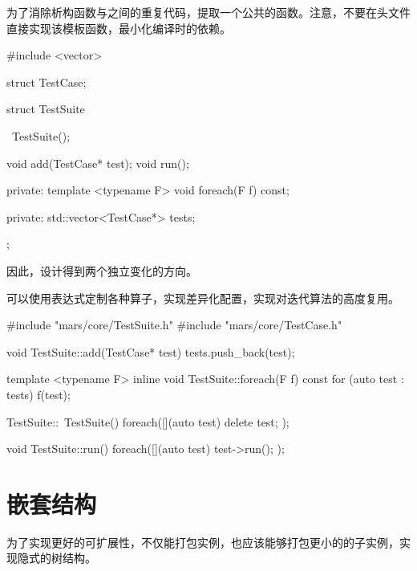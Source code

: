 \begin{content}
为了消除析构函数与之间的重复代码，提取一个公共的函数。注意，不要在头文件直接实现该模板函数，最小化编译时的依赖。

\begin{leftbar}
 \begin{c++}[caption={\ttfamily{include/mars/core/TestSuite.h}}]
#include <vector>

struct TestCase;

struct TestSuite {
  ~TestSuite();

  void add(TestCase* test);
  void run();

private:
  template <typename F>
  void foreach(F f) const;

private:
  std::vector<TestCase*> tests;
};
 \end{c++}
\end{leftbar}

因此，设计得到两个独立变化的方向。

\begin{enum}
\end{enum}

可以使用表达式定制各种算子，实现差异化配置，实现对迭代算法的高度复用。

\begin{leftbar}
 \begin{c++}[caption={\ttfamily{src/mars/core/TestSuite.cc}}]
#include "mars/core/TestSuite.h"
#include "mars/core/TestCase.h"

void TestSuite::add(TestCase* test) {
  tests.push_back(test);
}

template <typename F>
inline void TestSuite::foreach(F f) const {
  for (auto test : tests) {
    f(test);
  }
}

TestSuite::~TestSuite() {
  foreach([](auto test) {
    delete test;
  });
}

void TestSuite::run() {
  foreach([](auto test) {
    test->run();
  });
}
 \end{c++}
\end{leftbar}

\section{嵌套结构}

为了实现更好的可扩展性，不仅能打包实例，也应该能够打包更小的的子实例，实现隐式的树结构。



\end{content}
